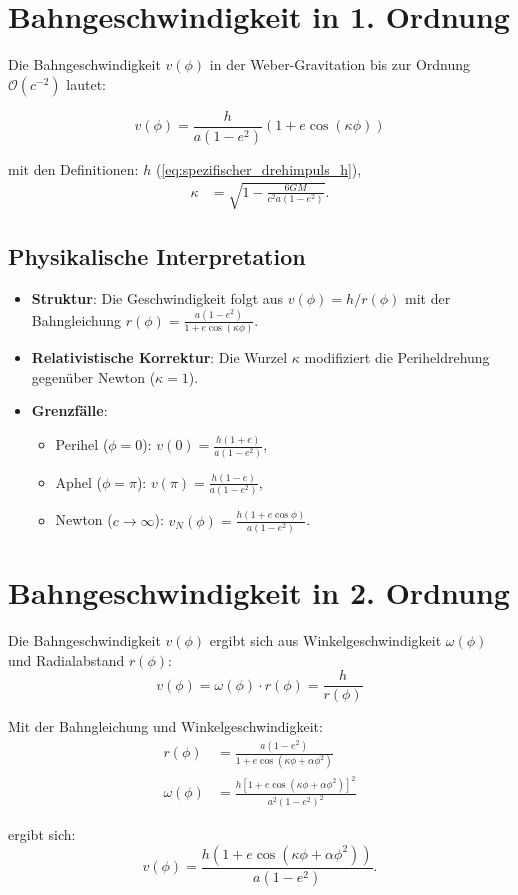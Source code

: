 \newpage
\section{Bahngeschwindigkeit in 1. Ordnung}
Die Bahngeschwindigkeit \(v(\phi)\) in der Weber-Gravitation bis zur Ordnung \(\mathcal{O}(c^{-2})\) lautet:

\begin{equation}
v(\phi) = \frac{h}{a(1 - e^2)} \left(1 + e \cos\left(\kappa\phi\right)\right)
\end{equation}

\noindent mit den Definitionen:
$h$ (\ref{eq:spezifischer_drehimpuls_h}),
\begin{align*}
\kappa &= \sqrt{1 - \frac{6GM}{c^2a(1 - e^2)}}.
\end{align*}

\subsection*{Physikalische Interpretation}
\begin{itemize}
    \item \textbf{Struktur}: Die Geschwindigkeit folgt aus \(v(\phi) = h/r(\phi)\) mit der Bahngleichung \(r(\phi) = \frac{a(1 - e^2)}{1 + e \cos(\kappa\phi)}\).
    \item \textbf{Relativistische Korrektur}: Die Wurzel \(\kappa\) modifiziert die Periheldrehung gegenüber Newton (\(\kappa = 1\)).
    \item \textbf{Grenzfälle}:
        \begin{itemize}
            \item Perihel (\(\phi = 0\)): \(v(0) = \frac{h(1 + e)}{a(1 - e^2)}\),
            \item Aphel (\(\phi = \pi\)): \(v(\pi) = \frac{h(1 - e)}{a(1 - e^2)}\),
            \item Newton (\(c \to \infty\)): \(v_N(\phi) = \frac{h(1 + e \cos\phi)}{a(1 - e^2)}\).
        \end{itemize}
\end{itemize}

\section{Bahngeschwindigkeit in 2. Ordnung}
Die Bahngeschwindigkeit $v(\phi)$ ergibt sich aus Winkelgeschwindigkeit $\omega(\phi)$ und Radialabstand $r(\phi)$:
\begin{equation}
v(\phi) = \omega(\phi) \cdot r(\phi) = \frac{h}{r(\phi)}
\end{equation}

Mit der Bahngleichung und Winkelgeschwindigkeit:
\begin{align}
r(\phi) &= \frac{a(1-e^2)}{1 + e\cos\left(\kappa\phi + \alpha\phi^2\right)}\\
\omega(\phi) &= \frac{h[1 + e\cos(\kappa\phi + \alpha\phi^2)]^2}{a^2(1-e^2)^2}
\end{align}

ergibt sich:
\begin{equation}
v(\phi) = \frac{h \left(1 + e\cos(\kappa\phi + \alpha\phi^2)\right)}{a(1 - e^2)}.
\end{equation}
